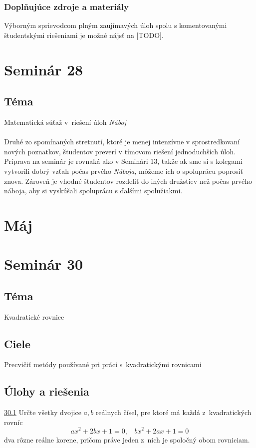 \subsubsection*{Doplňujúce zdroje a materiály}

Výborným sprievodcom plným zaujímavých úloh spolu s komentovanými študentskými riešeniami je možné nájsť na [TODO]. 


\newpage

\section*{Seminár 28}

\subsection*{Téma}
Matematická súťaž v~riešení úloh \textit{Náboj}\\
\\
\kom Druhé zo spomínaných stretnutí, ktoré je menej intenzívne v sprostredkovaní nových poznatkov, študentov preverí v tímovom riešení jednoduchších úloh. Príprava na seminár je rovnaká ako v Seminári 13, takže ak sme si s kolegami vytvorili dobrý vzťah počas prvého \textit{Náboja}, môžeme ich o spoluprácu poprosiť znova. Zároveň je vhodné študentov rozdeliť do iných družstiev než počas prvého náboja, aby si vyskúšali spoluprácu s ďalšími spolužiakmi. 

\section{Máj}

\section*{Seminár 30}

\subsection*{Téma}
Kvadratické rovnice

\subsection*{Ciele}
Precvičiť metódy používané pri práci s~kvadratickými rovnicami

\subsection*{Úlohy a riešenia}
\noindent \ul{30.1}  Určte všetky dvojice $a, b$ reálnych čísel, pre ktoré má každá z~kvadratických rovníc
$$ax^2 + 2bx + 1 = 0, \ \ \ \ bx^2 + 2ax + 1 = 0$$
dva rôzne reálne korene, pričom práve jeden z~nich je spoločný obom rovniciam.




